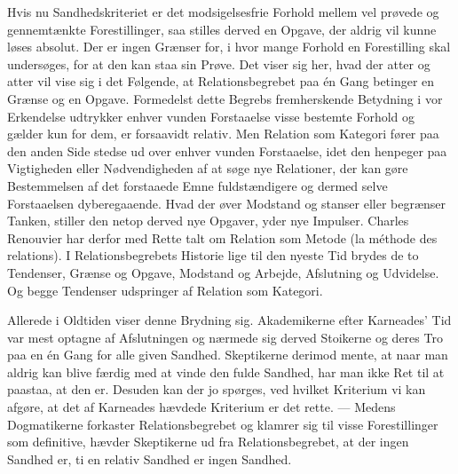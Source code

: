 \documentclass[12pt]{article}
\newcommand{\opage}[1]{\marginnote{\footnotesize\textit{[#1]}}}
\begin{document}
Hvis nu Sandhedskriteriet er det modsigelsesfrie Forhold mellem vel prøvede og
gennemtænkte Forestillinger, saa stilles derved en Opgave, der aldrig vil
kunne løses absolut. Der er ingen Grænser for, i hvor mange Forhold en
Forestilling skal undersøges, for at den kan staa sin Prøve. Det viser sig
her, hvad der atter og atter vil vise sig i det Følgende, at Relationsbegrebet
paa én Gang betinger en Grænse og en Opgave. Formedelst dette Begrebs
fremherskende Betydning i vor Erkendelse udtrykker enhver vunden Forstaaelse
visse bestemte Forhold og gælder
\opage{8} kun for dem, er forsaavidt \guillemotright relativ\guillemotleft. Men Relation
som Kategori fører paa den anden Side stedse ud over enhver vunden
Forstaaelse, idet den henpeger paa Vigtigheden eller Nødvendigheden af at søge
nye Relationer, der kan gøre Bestemmelsen af det forstaaede Emne
fuldstændigere og dermed selve Forstaaelsen dyberegaaende. Hvad der øver
Modstand og stanser eller begrænser Tanken, stiller den netop derved nye
Opgaver, yder nye Impulser. Charles Renouvier har derfor med Rette talt om
Relation som Metode (la méthode des relations). I Relationsbegrebets Historie
lige til den nyeste Tid brydes de to Tendenser, Grænse og Opgave, Modstand og
Arbejde, Afslutning og Udvidelse. Og begge Tendenser udspringer af Relation
som Kategori.

Allerede i Oldtiden viser denne Brydning sig. Akademikerne efter Karneades'
Tid var mest optagne af Afslutningen og nærmede sig derved Stoikerne og deres
Tro paa en én Gang for alle given Sandhed. Skeptikerne derimod mente, at naar
man aldrig kan blive færdig med at vinde den fulde Sandhed, har man ikke Ret
til at paastaa, at den er. Desuden kan der jo spørges, ved hvilket Kriterium
vi kan afgøre, at det af Karneades hævdede Kriterium er det rette. --- Medens
Dogmatikerne forkaster Relationsbegrebet og klamrer sig til visse
Forestillinger som definitive, hævder Skeptikerne ud fra Relationsbegrebet, at
der ingen Sandhed er, ti en relativ Sandhed er ingen Sandhed.
\end{document}

